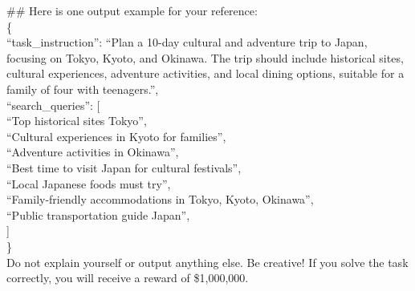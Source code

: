 \documentclass{article}
\begin{document}
\begin{prompt}[title={Prompt: Instruction Generation}, label=prompt:instruction_generation]
\#\# Here is one output example for your reference:\\
\{\\
\hspace*{1em}``task\_instruction'': ``Plan a 10-day cultural and adventure trip to Japan, focusing on Tokyo, Kyoto, and Okinawa. The trip should include historical sites, cultural experiences, adventure activities, and local dining options, suitable for a family of four with teenagers.'',\\
\hspace*{1em}``search\_queries'': [\\
\hspace*{2em}``Top historical sites Tokyo'',\\
\hspace*{2em}``Cultural experiences in Kyoto for families'',\\
\hspace*{2em}``Adventure activities in Okinawa'',\\
\hspace*{2em}``Best time to visit Japan for cultural festivals'',\\
\hspace*{2em}``Local Japanese foods must try'',\\
\hspace*{2em}``Family-friendly accommodations in Tokyo, Kyoto, Okinawa'',\\
\hspace*{2em}``Public transportation guide Japan'',\\
\hspace*{1em}]\\
\}\\

Do not explain yourself or output anything else. Be creative! If you solve the task correctly, you will receive a reward of \$1,000,000.\\
\end{prompt}
\end{document}
